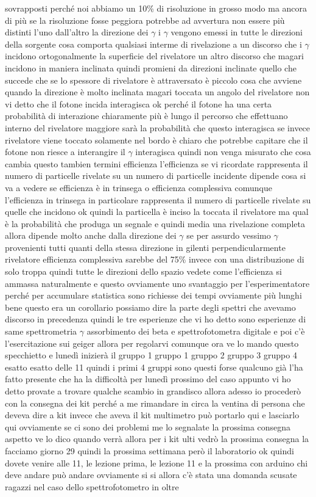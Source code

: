 sovrapposti perché noi abbiamo un 10\% di risoluzione in grosso modo ma ancora di più se la risoluzione fosse peggiora potrebbe ad avvertura non essere più distinti l'uno dall'altro la direzione dei $\gamma$ i $\gamma$ vengono emessi in tutte le direzioni della sorgente cosa comporta qualsiasi interme di rivelazione a un discorso che i $\gamma$ incidono ortogonalmente la superficie del rivelatore un altro discorso che magari incidono in maniera inclinata quindi promieni da direzioni inclinate quello che succede che se lo spessore di rivelatore è attraversato è piccolo cosa che avviene quando la direzione è molto inclinata magari toccata un angolo del rivelatore non vi detto che il fotone incida interagisca ok perché il fotone ha una certa probabilità di interazione chiaramente più è lungo il percorso che effettuano interno del rivelatore maggiore sarà la probabilità che questo interagisca se invece rivelatore viene toccato solamente nel bordo è chiaro che potrebbe capitare che il fotone non riesce a interangire il $\gamma$ interagisca quindi non venga misurato che cosa cambia questo tambien termini efficienza l'efficienza se vi ricordate rappresenta il numero di particelle rivelate su un numero di particelle incidente dipende cosa si va a vedere se efficienza è in trinsega o efficienza complessiva comunque l'efficienza in trinsega in particolare rappresenta il numero di particelle rivelate su quelle che incidono ok quindi la particella è inciso la toccata il rivelatore ma qual è la probabilità che produga un segnale e quindi media una rivelazione completa allora dipende molto anche dalla direzione dei $\gamma$ se per assurdo vessimo $\gamma$ provenienti tutti quanti della stessa direzione in gilenti perpendicularmente rivelatore efficienza complessiva sarebbe del 75\% invece con una distribuzione di solo troppa quindi tutte le direzioni dello spazio vedete come l'efficienza si ammassa naturalmente e questo ovviamente uno svantaggio per l'esperimentatore perché per accumulare statistica sono richiesse dei tempi ovviamente più lunghi bene questo era un corollario possiamo dire la parte degli spettri che avevamo discorso in precedenza quindi le tre esperienze che vi ho detto sono esperienze di same spettrometria $\gamma$ assorbimento dei beta e spettrofotometra digitale e poi c'è l'esercitazione sui geiger allora per regolarvi comunque ora ve lo mando questo specchietto e lunedì inizierà il gruppo 1 gruppo 1 gruppo 2 gruppo 3 gruppo 4 esatto esatto delle 11 quindi i primi 4 gruppi sono questi forse qualcuno già l'ha fatto presente che ha la difficoltà per lunedì prossimo del caso appunto vi ho detto provate a trovare qualche scambio in grandisco allora adesso io procederò con la consegna dei kit perché a me rimandare in circa la ventina di persona che deveva dire a kit invece che aveva il kit multimetro può portarlo qui e lasciarlo qui ovviamente se ci sono dei problemi me lo segnalate la prossima consegna aspetto ve lo dico quando verrà allora per i kit ulti vedrò la prossima consegna la facciamo giorno 29 quindi la prossima settimana però il laboratorio ok quindi dovete venire alle 11, le lezione prima, le lezione 11 e la prossima con arduino chi deve andare può andare ovviamente si si allora c'è stata una domanda scusate ragazzi nel caso dello spettrofotometro in oltre 